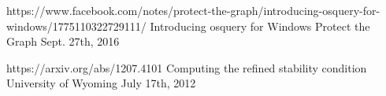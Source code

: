 


\begin{cventries}


\cventry
{https://www.facebook.com/notes/protect-the-graph/introducing-osquery-for-windows/1775110322729111/} %
{Introducing osquery for Windows} %
{Protect the Graph} %
{Sept. 27th, 2016} %
{ %
\begin{cvitems}
\end{cvitems}
}


\cventry
{https://arxiv.org/abs/1207.4101} %
{Computing the refined stability condition} %
{University of Wyoming} %
{July 17th, 2012} %
{ %
\begin{cvitems}
\end{cvitems}
}


\end{cventries}